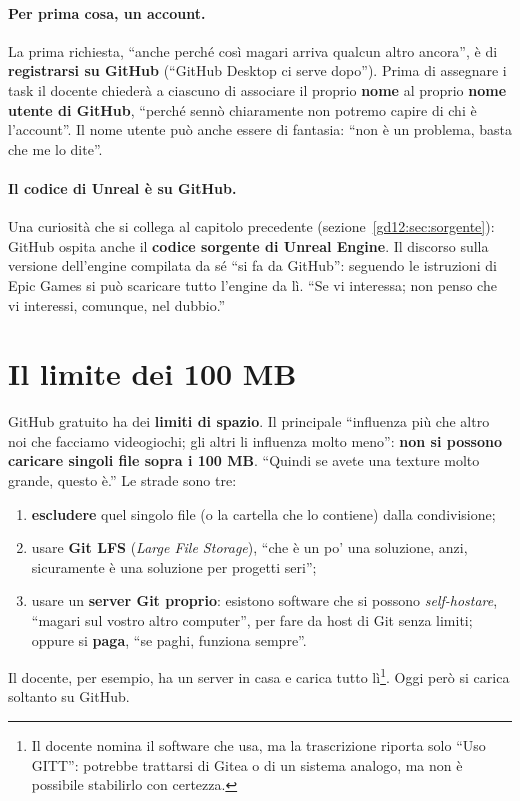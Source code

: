 \paragraph{Per prima cosa, un account.} La prima richiesta, ``anche perché così
magari arriva qualcun altro ancora'', è di \textbf{registrarsi su GitHub}
(``GitHub Desktop ci serve dopo''). Prima di assegnare i task il docente
chiederà a ciascuno di associare il proprio \textbf{nome} al proprio
\textbf{nome utente di GitHub}, ``perché sennò chiaramente non potremo capire
di chi è l'account''. Il nome utente può anche essere di fantasia: ``non è un
problema, basta che me lo dite''.

\paragraph{Il codice di Unreal è su GitHub.} Una curiosità che si collega al
capitolo precedente (sezione~\ref{gd12:sec:sorgente}): GitHub ospita anche il
\textbf{codice sorgente di Unreal Engine}. Il discorso sulla versione
dell'engine compilata da sé ``si fa da GitHub'': seguendo le istruzioni di Epic
Games si può scaricare tutto l'engine da lì. ``Se vi interessa; non penso che
vi interessi, comunque, nel dubbio.''

\section{Il limite dei 100 MB}
\label{gd13:sec:limiti}

GitHub gratuito ha dei \textbf{limiti di spazio}. Il principale ``influenza
più che altro noi che facciamo videogiochi; gli altri li influenza molto
meno'': \textbf{non si possono caricare singoli file sopra i 100 MB}. ``Quindi
se avete una texture molto grande, questo è.'' Le strade sono tre:
\begin{enumerate}
  \item \textbf{escludere} quel singolo file (o la cartella che lo contiene)
        dalla condivisione;
  \item usare \textbf{Git LFS} (\emph{Large File Storage}), ``che è un po' una
        soluzione, anzi, sicuramente è una soluzione per progetti seri'';
  \item usare un \textbf{server Git proprio}: esistono software che si possono
        \emph{self-hostare}, ``magari sul vostro altro computer'', per fare da
        host di Git senza limiti; oppure si \textbf{paga}, ``se paghi,
        funziona sempre''.
\end{enumerate}
Il docente, per esempio, ha un server in casa e carica tutto lì\footnote{Il
docente nomina il software che usa, ma la trascrizione riporta solo ``Uso
GITT'': potrebbe trattarsi di Gitea o di un sistema analogo, ma non è
possibile stabilirlo con certezza.}. Oggi però si carica soltanto su GitHub.

